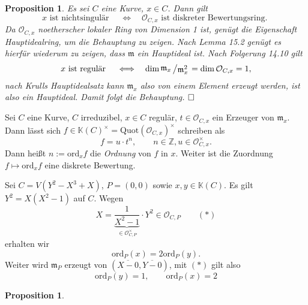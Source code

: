 \documentclass[11pt]{book}
\newtheorem{prop}[theorem]{Proposition}
\theoremstyle{nonumberbreak}
\newenvironment{pr}[1][]{\ifthenelse{\equal{#1}{}}{\proof}{\proof[#1]}\rm}{\endproof}
\newenvironment{ex}[1][]{\ifthenelse{\equal{#1}{}}{\example}{\example[#1]}\rm}{\endexample}
\newenvironment{bemdefin}[1][]{\ifthenelse{\equal{#1}{}}{\bemdefini}{\bemdefini[#1]}\rm}{\endbemdefini}
\newcommand{\slant}[2]{{\raisebox{.1em}{$#1$}\left/\raisebox{-.1em}{$#2$}\right.}}
\begin{document}
\begin{spacing}{1.3}
\begin{prop} %

Es sei $C$ eine Kurve, $x \in C$. Dann gilt
$$x \textrm{ ist nichtsingulär } \quad \Longleftrightarrow \quad \mathcal{O}_{C,x} \textrm{ ist diskreter Bewertungsring. }$$
\begin{pr}
Da $\mathcal{O}_{C,x}$ noetherscher lokaler Ring von Dimension 1 ist, genügt die Eigenschaft Hauptidealring, um die Behauptung zu zeigen. Nach Lemma 15.2 genügt es hierfür wiederum zu zeigen, dass $\mathfrak{m}$ ein Hauptideal ist. Nach Folgerung 14.10 gilt
$$x \textrm{ ist regulär } \quad \Longleftrightarrow \quad \dim \slant{\mathfrak{m}_x}{\mathfrak{m}_x^2} = \dim \mathcal{O}_{C,x} = 1, $$
nach Krulls Hauptidealsatz kann $\mathfrak{m}_x$ also von einem Element erzeugt werden, ist also ein Hauptideal. Damit folgt die Behauptung. $\hfill \Box$
\end{pr}
\end{prop}


\begin{bemdefin} %

Sei $C$ eine Kurve, $C$ irreduzibel, $x \in C$ regulär, $t \in \mathcal{O}_{C,x}$ ein Erzeuger von $\mathfrak{m}_x$. Dann lässt sich $f \in \mathbb{K}(C)^{\times}= \textrm{Quot}(\mathcal{O}_{C,x})^{\times}$ schreiben als
$$f = u \cdot t^n, \qquad n \in \mathbb{Z}, u \in \mathcal{O}_{C,x}^{\times}.$$
Dann heißt $n:= \textrm{ord}_xf$ die \textit{Ordnung} von $f$ in $x$. Weiter ist die Zuordnung $f \mapsto \textrm{ord}_xf$ eine diskrete Bewertung.
\end{bemdefin}


\begin{ex}

Sei $C=V(Y^2-X^3+X)$, $P=(0,0)$ sowie $x,y \in \mathbb{K}(C)$. Es gilt
$Y^2=X(X^2-1)$ auf $C$. Wegen
$$X= \underbrace{\frac{1}{X^2-1}}_{\in \mathcal{O}_{C,P}^{\times}} \cdot Y^2 \in \mathcal{O}_{C,P} \qquad (*)$$
erhalten wir
$$\textrm{ord}_P (x) = 2 \textrm{ord}_P (y).$$
Weiter wird $\mathfrak{m}_P$ erzeugt von $\left( \overline{X-0}, \overline{Y-0} \right)$, mit $(*)$ gilt also 
$$\textrm{ord}_P( y) =1, \qquad \textrm{ord}_P (x )= 2$$
\end{ex}



\begin{prop} %


\end{prop}
\end{spacing}
\end{document}
